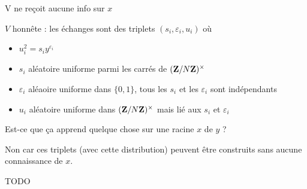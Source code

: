 V ne reçoit aucune info sur $x$

$V$ honnête : les échanges sont des triplets $(s_i, \varepsilon_i, u_i)$ où
\begin{itemize}
	\item[\textbullet] $u_i^2 = s_i y^{\varepsilon_i}$
	\item[\textbullet] $s_i$ aléatoire uniforme parmi les carrés de $(\mathbf{Z} / N\mathbf{Z})^\times$
	\item[\textbullet] $\varepsilon_i$ aléaoire uniforme dans $\{ 0, 1 \}$, tous les $s_i$ et les $\varepsilon_i$ sont indépendants
	\item[\textbullet] $u_i$ aléatoire uniforme dans $(\mathbf{Z} / N\mathbf{Z})^\times$ mais lié aux $s_i$ et $\varepsilon_i$
\end{itemize}

Est-ce que ça apprend quelque chose sur une racine $x$ de $y$ ?

Non car ces triplets (avec cette distribution) peuvent être construits sans aucune connaissance de $x$.

TODO